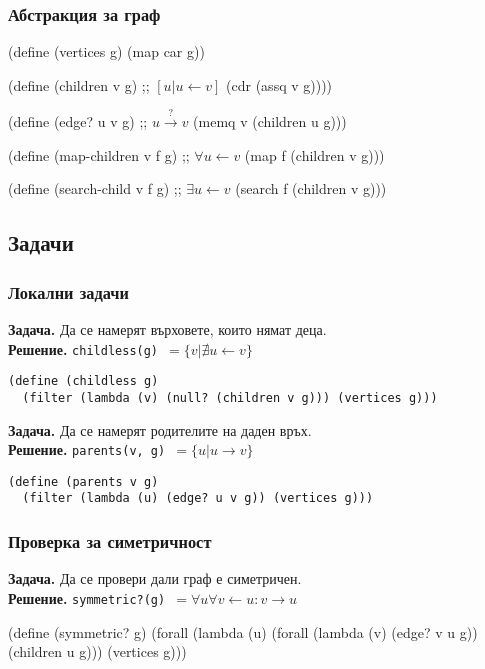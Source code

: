 \documentclass{beamer}
\begin{document}
\begin{frame}[fragile]
  \frametitle{Абстракция за граф}
\begin{semiverbatim}
(define (vertices g) (map car g))

(define (children v g)             ;; \alert{\([u|u\leftarrow{}v]\)}
  (cdr (assq v g))))

(define (edge? u v g)              ;; \alert{\(u\stackrel?\rightarrow{}v\)}
  (memq v (children u g)))

(define (map-children v f g)       ;; \alert{\(\forall{}u\leftarrow{}v\)}
  (map f (children v g)))

(define (search-child v f g)       ;; \alert{\(\exists{}u\leftarrow{}v\)}
  (search f (children v g)))
\end{semiverbatim}
\end{frame}

\subsection{Задачи}

\begin{frame}[fragile]
  \frametitle{Локални задачи}
  \small
  \textbf{Задача. }Да се намерят върховете, които нямат деца.\\
  \pause
  \textbf{Решение. }\tt{childless(g)} $ = \{v | \nexists u \leftarrow v \}$
  \pause
\begin{verbatim}
(define (childless g)
  (filter (lambda (v) (null? (children v g))) (vertices g)))
\end{verbatim}
  \pause
  \vspace{1em}
  \textbf{Задача. }Да се намерят родителите на даден връх.\\
  \pause
  \textbf{Решение. }\tt{parents(v, g)} $ = \{u | u \rightarrow v \}$
  \pause
\begin{verbatim}
(define (parents v g)
  (filter (lambda (u) (edge? u v g)) (vertices g)))
\end{verbatim}
\end{frame}

\begin{frame}[fragile]
  \frametitle{Проверка за симетричност}
  \textbf{Задача. }Да се провери дали граф е симетричен.\\
  \pause
  \textbf{Решение. }\tt{symmetric?(g)} $ = \forall u\forall v\leftarrow u: v\rightarrow u$
  \pause
\begin{semiverbatim}
(define (symmetric? g)
  (forall (lambda (u)
            (forall (lambda (v) (edge? v u g))
                    (children u g)))
            (vertices g)))
\end{semiverbatim}
\end{frame}
\end{document}
